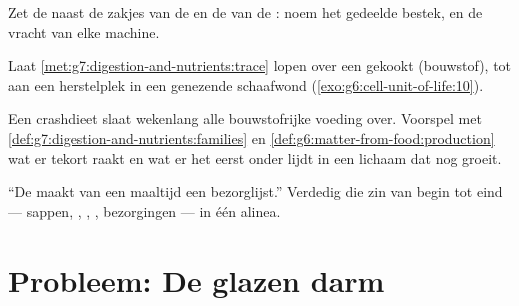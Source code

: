 \begin{exercise}[$\star\star$]\label{exo:g7:digestion-and-nutrients:9}
Zet de  naast de zakjes van de  en de  van de
: noem het gedeelde bestek, en de vracht van elke machine.
\end{exercise}

\begin{exercise}[$\star\star$]\label{exo:g7:digestion-and-nutrients:10}
Laat \cref{met:g7:digestion-and-nutrients:trace} lopen over een gekookt 
(bouwstof), tot aan een herstelplek in een genezende schaafwond
(\cref{exo:g6:cell-unit-of-life:10}).
\end{exercise}

\begin{exercise}[$\star\star$]\label{exo:g7:digestion-and-nutrients:11}
Een crashdieet slaat wekenlang alle bouwstofrijke voeding over. Voorspel
met \cref{def:g7:digestion-and-nutrients:families} en
\cref{def:g6:matter-from-food:production} wat er tekort raakt en wat er
het eerst onder lijdt in een lichaam dat nog groeit.
\end{exercise}

\begin{exercise}[$\star\star\star$]\label{exo:g7:digestion-and-nutrients:12}
``De  maakt van een maaltijd een bezorglijst.'' Verdedig die zin
van begin tot eind --- sappen, , , ,
bezorgingen --- in één alinea.
\end{exercise}

\section{Probleem: De glazen darm}

